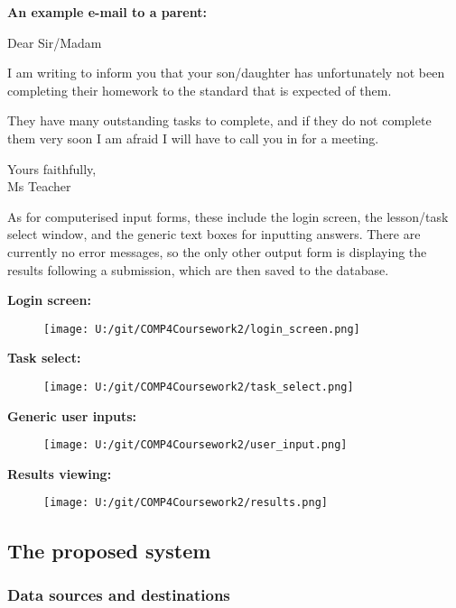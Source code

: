 \textbf{An example e-mail to a parent:}

Dear Sir/Madam

I am writing to inform you that your son/daughter has unfortunately not been completing their homework to the standard that is expected of them. 

They have many outstanding tasks to complete, and if they do not complete them very soon I am afraid I will have to call you in for a meeting.

Yours faithfully, \\
Ms Teacher

As for computerised input forms, these include the login screen, the lesson/task select window, and the generic text boxes for inputting answers. There are currently no error messages, so the only other output form is displaying the results following a submission, which are then saved to the database.

\textbf{Login screen:}

\begin{figure}[H]
    \texttt{[image: U:/git/COMP4Coursework2/login\_screen.png]}
\end{figure}

\textbf{Task select:}

\begin{figure}[H]
    \texttt{[image: U:/git/COMP4Coursework2/task\_select.png]}
\end{figure}

\textbf{Generic user inputs:}

\begin{figure}[H]
    \texttt{[image: U:/git/COMP4Coursework2/user\_input.png]}
\end{figure}

\textbf{Results viewing:}

\begin{figure}[H]
    \texttt{[image: U:/git/COMP4Coursework2/results.png]}
\end{figure}

\subsection{The proposed system}

\subsubsection{Data sources and destinations}

